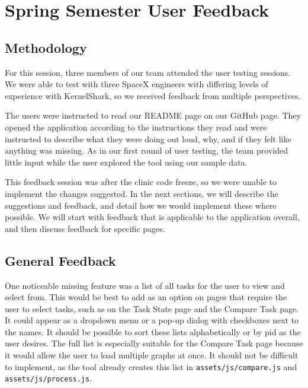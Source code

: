 \documentclass{hmcclinic}
\begin{document}
\chapter{Spring Semester User Feedback}
\section{Methodology}
   For this session, three members of our team attended the user testing sessions.
   We were able to test with three SpaceX engineers with differing levels of
   experience with KernelShark, so we received feedback from multiple perspectives.

   The users were instructed to read our README page on our GitHub page. They
   opened the application according to the instructions they read and were
   instructed to describe what they were doing out loud, why, and if they felt
   like anything was missing. As in our first round of user testing, the team
   provided little input while the user explored the tool using our sample data.

   This feedback session was after the clinic code freeze, so we were unable to
   implement the changes suggested. In the next sections, we will describe the
   suggestions and feedback, and detail how we would implement these where
   possible. We will start with feedback that is applicable to the application
   overall, and then discuss feedback for specific pages.

\section{General Feedback}

One noticeable missing feature was a list of all tasks for the user to view and select from. 
This would be best to add as an option on pages that require the user to select tasks, such 
as on the Task State page and the Compare Task page. It could appear as a dropdown menu or a 
pop-up dialog with checkboxes next to the names. It should be possible to sort these lists 
alphabetically or by pid as the user desires. The full list is especially suitable for the 
Compare Task page because it would allow the user to load multiple graphs at once. It should 
not be difficult to implement, as the tool already creates this list in 
\texttt{assets/js/compare.js} and \texttt{assets/js/process.js}.
\end{document}
